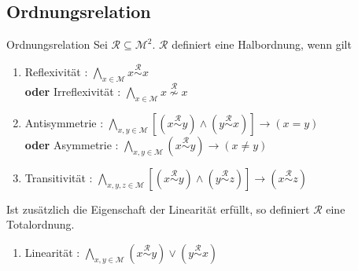 \documentclass[]{beamer}
\begin{document}
\subsection{Ordnungsrelation}
\begin{frame}[squeeze]{}
  \vspace*{-0.25em}
  \begin{block}{Ordnungsrelation}
    Sei $\mathcal{R} \subseteq \mathcal{M}^2$. $\mathcal{R}$ definiert eine Halbordnung, wenn gilt
    \pause
    \begin{enumerate}
      \item \hspace*{4pt}Reflexivität : \hspace{15pt} $\underset{x \in \mathcal{M}}{\bigwedge} x \overset{\mathcal{R}}{\sim} x$ \\
        \hspace*{-22pt}\textbf{oder} Irreflexivität : \hspace{12pt} $\underset{x \in \mathcal{M}}{\bigwedge} x \overset{\mathcal{R}}{\nsim} x$
        \pause
      \item \hspace*{4pt}Antisymmetrie : $\underset{x, y \in \mathcal{M}}{\bigwedge} [(x \overset{\mathcal{R}}{\sim} y) \land (y \overset{\mathcal{R}}{\sim} x)] \rightarrow (x = y)$ \\
        \hspace*{-22pt}\textbf{oder} Asymmetrie : \hspace{9pt} $\underset{x, y \in \mathcal{M}}{\bigwedge} (x \overset{\mathcal{R}}{\sim} y) \rightarrow (x \neq y)$
        \pause
      \item \hspace*{4pt}Transitivität : \hspace{4pt} $\underset{x, y, z \in \mathcal{M}}{\bigwedge} [(x \overset{\mathcal{R}}{\sim} y) \land (y \overset{\mathcal{R}}{\sim} z)] \rightarrow (x \overset{\mathcal{R}}{\sim} z)$
        \pause
    \end{enumerate}
  \end{block}
  \vspace*{-0.5em}
  \begin{definition}
    Ist zusätzlich die Eigenschaft der Linearität erfüllt, so definiert $\mathcal{R}$ eine Totalordnung.
    \begin{enumerate}
      \item Linearität : $\underset{x, y \in \mathcal{M}}{\bigwedge} (x \overset{\mathcal{R}}{\sim} y) \vee (y \overset{\mathcal{R}}{\sim} x)$
    \end{enumerate}
  \end{definition}
\end{frame}
\end{document}
